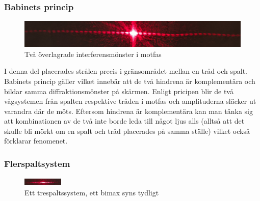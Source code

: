 \documentclass[a4paper]{article}
\begin{document}
\subsubsection{Babinets princip}
\begin{figure}[h!]
	\centering
	\includegraphics[width=\textwidth]{babinet.jpg}
	\caption{Två överlagrade interferensmönster i motfas}
	\label{fig:babinet}
\end{figure}
I denna del placerades strålen precis i gränsområdet mellan en tråd och spalt. Babinets princip gäller vilket innebär att
de två hindrena är komplementära och bildar samma diffraktionsmönster på skärmen. Enligt pricipen blir de två vågsystemen från
spalten respektive tråden i motfas och amplituderna släcker ut varandra där de möts. Eftersom hindrena är komplementära kan man tänka
sig att kombinationen av de två inte borde leda till något ljus alls (alltså att det skulle bli mörkt om en spalt och tråd placerades på samma ställe)
vilket också förklarar fenomenet.
\subsubsection{Flerspaltsystem}
\begin{figure}[h!]
	\centering
	\includegraphics[width=0.17\textwidth, angle=90]{3spalt.jpg}
	\caption{Ett trespaltssystem, ett bimax syns tydligt}
	\label{fig:3spalt}
\end{figure}
\end{document}
